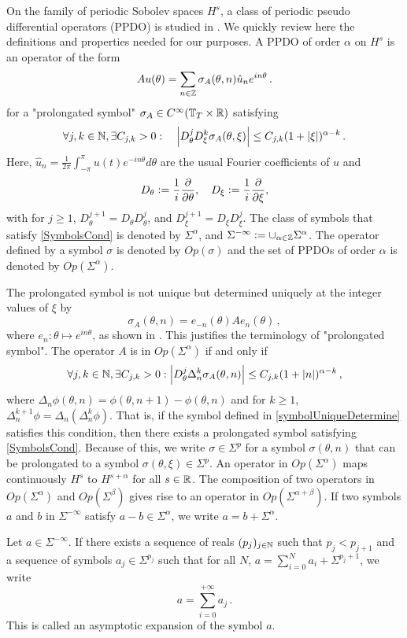 \documentclass[a4paper]{article}
\begin{document}
On the family of periodic Sobolev spaces $H^s$, a class of periodic pseudo differential operators (PPDO) is studied in \cite{thrunen1998symbol}. We quickly review here the definitions and properties needed for our purposes. A PPDO of order $\alpha$ on $H^s$ is an operator of the form 
\[Au(\theta) =  \sum_{n \in \mathbb{Z}} \sigma_A(\theta,n) \hat{u}_n e^{in\theta}\,.\]
for a "prolongated symbol" $\sigma_A \in C^{\infty}(\mathbb{T}_T \times \mathbb{R})$ satisfying 
\begin{equation}
\label{SymbolsCond}
	\forall j,k \in \mathbb{N}, \exists C_{j,k} >0 : \quad \left\lvert D^j_\theta D_\xi^k \sigma_A(\theta,\xi) \right\rvert \leq C_{j,k}(1 + \left\lvert \xi \right\rvert)^{\alpha - k}\,.
\end{equation}
Here, $\hat{u}_n = \frac{1}{2\pi}\int_{-\pi}^{\pi}u(t) e^{-in\theta}d\theta$ are the usual Fourier coefficients of $u$ and 
$${D_\theta \mathrel{\mathop:}= \frac{1}{i}\frac{\partial}{\partial \theta}}, \quad  D_\xi \mathrel{\mathop:}= \frac{1}{i}\frac{\partial}{\partial \xi},$$ 
with for $j \geq 1$, $D_\theta^{j+1} = D_\theta D_\theta^j$, and $D_\xi^{j+1} = D_\xi D_\xi^j$. 
The class of symbols that satisfy \eqref{SymbolsCond} is denoted by $\Sigma^\alpha$, and $\Sigma^{-\infty} \mathrel{\mathop:}= \cup_{\alpha \in \mathbb{Z}} \Sigma^\alpha$. The operator defined by a symbol $\sigma$ is denoted by $\textit{Op}(\sigma)$ and the set of PPDOs of order $\alpha$ is denoted by $\textit{Op}(\Sigma^\alpha)$. 

The prolongated symbol is not unique but determined uniquely at the integer values of $\xi$ by 
\begin{equation}
	\label{symbolUniqueDetermine}
	\sigma_A(\theta,n) =  e_{-n}(\theta)Ae_n(\theta)\,,
\end{equation}
where $e_n : \theta \mapsto e^{in\theta}$, as shown in \cite{thrunen1998symbol}. This justifies the terminology of "prolongated symbol". The operator $A$ is in $\textit{Op}(\Sigma^\alpha)$ if and only if
\[\forall j,k \in \mathbb{N}, \exists C_{j,k} > 0 : \left\lvert D_\theta^j \Delta_n^k \sigma_A(\theta,n) \right\rvert \leq C_{j,k}(1 + \left\lvert n \right\rvert)^{\alpha - k}\,,\] 
where $\Delta_n \phi(\theta,n) = \phi(\theta,n+1) - \phi(\theta,n)$ and for $k \geq 1$, $\Delta^{k+1}_n\phi = \Delta_n (\Delta^k_n \phi)$. That is, if the symbol defined in \eqref{symbolUniqueDetermine} satisfies this condition, then there exists a prolongated symbol satisfying \eqref{SymbolsCond}. Because of this, we write $\sigma \in \Sigma^p$ for a symbol $\sigma(\theta,n)$ that can be prolongated to a symbol ${\sigma}(\theta,\xi) \in \Sigma^p$. An operator in $\textit{Op}(\Sigma^\alpha)$ maps continuously $H^s$ to $H^{s + \alpha}$ for all $s \in \mathbb{R}$. The composition of two operators in $\textit{Op}(\Sigma^\alpha)$ and $\textit{Op}(\Sigma^\beta)$ gives rise to an operator in $\textit{Op}(\Sigma^{\alpha+\beta})$. 
If two symbols $a$ and $b$ in $\Sigma^{- \infty}$ satisfy $a - b  \in \Sigma^{\alpha}$, we write $a = b + \Sigma^\alpha$. 
\begin{Def}
	Let $a \in \Sigma^{- \infty}$. If there exists a sequence of reals $(p_j)_{j \in \mathbb{N}}$ such that $p_j < p_{j+1}$ and a sequence of symbols $a_j \in \Sigma^{p_j}$ such that for all $N$, $a = \sum_{i = 0}^{N}a_i + \Sigma^{p_j + 1}$, we write 
	\[a = \sum_{i = 0}^{+ \infty} a_j \,.\]
	This is called an asymptotic expansion of the symbol $a$. 
\end{Def}
\end{document}
